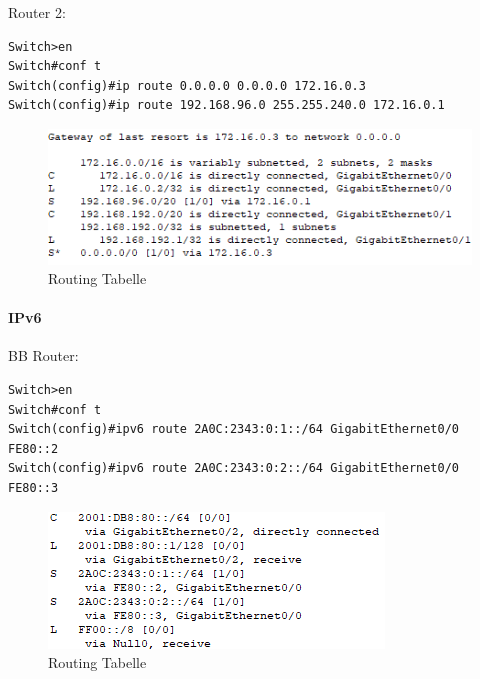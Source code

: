 \noindent
Router 2:
\begin{lstlisting}
Switch>en
Switch#conf t
Switch(config)#ip route 0.0.0.0 0.0.0.0 172.16.0.3
Switch(config)#ip route 192.168.96.0 255.255.240.0 172.16.0.1
\end{lstlisting}
\begin{figure}[!htb]
    \centering
    \includegraphics[width=\textwidth,height=.75\textwidth,keepaspectratio]{./routing/ipv4_2.png}
    \caption{Routing Tabelle}
\end{figure}

\paragraph{IPv6}
BB Router:
\begin{lstlisting}
Switch>en
Switch#conf t
Switch(config)#ipv6 route 2A0C:2343:0:1::/64 GigabitEthernet0/0 
FE80::2
Switch(config)#ipv6 route 2A0C:2343:0:2::/64 GigabitEthernet0/0 
FE80::3
\end{lstlisting}
\begin{figure}[!htb]
    \centering
    \includegraphics[width=\textwidth,height=.75\textwidth,keepaspectratio]{./routing/ipv6_bb.png}
    \caption{Routing Tabelle}
\end{figure}

